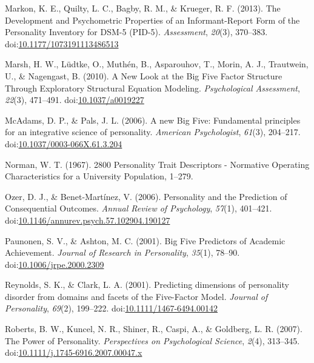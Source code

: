 \documentclass[,man,floatsintext]{apa6}
\theoremstyle{definition}
\theoremstyle{definition}
\theoremstyle{definition}
\theoremstyle{remark}
\begin{document}
\leavevmode\hypertarget{ref-Markon2013}{}%
Markon, K. E., Quilty, L. C., Bagby, R. M., \& Krueger, R. F. (2013).
The Development and Psychometric Properties of an Informant-Report Form
of the Personality Inventory for DSM-5 (PID-5). \emph{Assessment},
\emph{20}(3), 370--383.
doi:\href{https://doi.org/10.1177/1073191113486513}{10.1177/1073191113486513}

\leavevmode\hypertarget{ref-Marsh2010}{}%
Marsh, H. W., Lüdtke, O., Muthén, B., Asparouhov, T., Morin, A. J.,
Trautwein, U., \& Nagengast, B. (2010). A New Look at the Big Five
Factor Structure Through Exploratory Structural Equation Modeling.
\emph{Psychological Assessment}, \emph{22}(3), 471--491.
doi:\href{https://doi.org/10.1037/a0019227}{10.1037/a0019227}

\leavevmode\hypertarget{ref-McAdams2006a}{}%
McAdams, D. P., \& Pals, J. L. (2006). A new Big Five: Fundamental
principles for an integrative science of personality. \emph{American
Psychologist}, \emph{61}(3), 204--217.
doi:\href{https://doi.org/10.1037/0003-066X.61.3.204}{10.1037/0003-066X.61.3.204}

\leavevmode\hypertarget{ref-Norman1967}{}%
Norman, W. T. (1967). 2800 Personality Trait Descriptors - Normative
Operating Characteristics for a University Population, 1--279.

\leavevmode\hypertarget{ref-OzerBenet2006}{}%
Ozer, D. J., \& Benet-Martínez, V. (2006). Personality and the
Prediction of Consequential Outcomes. \emph{Annual Review of
Psychology}, \emph{57}(1), 401--421.
doi:\href{https://doi.org/10.1146/annurev.psych.57.102904.190127}{10.1146/annurev.psych.57.102904.190127}

\leavevmode\hypertarget{ref-Paunonen2001}{}%
Paunonen, S. V., \& Ashton, M. C. (2001). Big Five Predictors of
Academic Achievement. \emph{Journal of Research in Personality},
\emph{35}(1), 78--90.
doi:\href{https://doi.org/10.1006/jrpe.2000.2309}{10.1006/jrpe.2000.2309}

\leavevmode\hypertarget{ref-ClarkReynolds2001}{}%
Reynolds, S. K., \& Clark, L. A. (2001). Predicting dimensions of
personality disorder from domains and facets of the Five-Factor Model.
\emph{Journal of Personality}, \emph{69}(2), 199--222.
doi:\href{https://doi.org/10.1111/1467-6494.00142}{10.1111/1467-6494.00142}

\leavevmode\hypertarget{ref-Roberts2007a}{}%
Roberts, B. W., Kuncel, N. R., Shiner, R., Caspi, A., \& Goldberg, L. R.
(2007). The Power of Personality. \emph{Perspectives on Psychological
Science}, \emph{2}(4), 313--345.
doi:\href{https://doi.org/10.1111/j.1745-6916.2007.00047.x}{10.1111/j.1745-6916.2007.00047.x}
\end{document}
